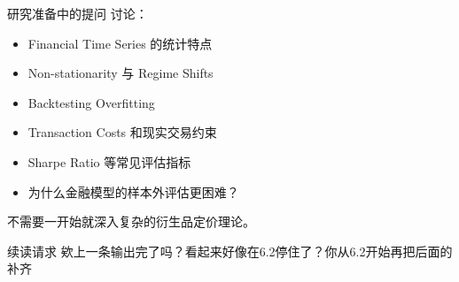 \begin{readerquestion}{研究准备中的提问}
讨论：

\begin{itemize}
\tightlist
\item
  Financial Time Series 的统计特点
\item
  Non-stationarity 与 Regime Shifts
\item
  Backtesting Overfitting
\item
  Transaction Costs 和现实交易约束
\item
  Sharpe Ratio 等常见评估指标
\item
  为什么金融模型的样本外评估更困难？
\end{itemize}

不需要一开始就深入复杂的衍生品定价理论。
\end{readerquestion}

\begin{readerquestion}{续读请求}
欸上一条输出完了吗？看起来好像在6.2停住了？你从6.2开始再把后面的补齐
\end{readerquestion}
